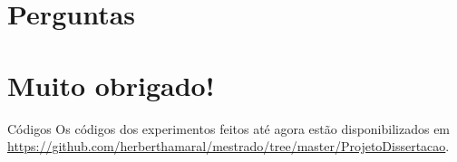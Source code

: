 \documentclass{beamer}
\begin{document}
  \section{Perguntas}
  \section{Muito obrigado!}
  \begin{frame}{Códigos}
      Os códigos dos experimentos feitos até agora estão disponibilizados em \url{https://github.com/herberthamaral/mestrado/tree/master/ProjetoDissertacao}.
  \end{frame}

  \begin{frame}
      
      
  \end{frame}
\end{document}
